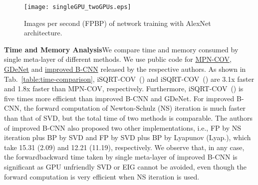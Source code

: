 \documentclass[10pt,twocolumn,letterpaper]{article}
\begin{document}
\begin{figure}[thb]
\vspace{2pt}
\setlength\tabcolsep{8pt}
\renewcommand{\baselinestretch}{1.0}
\footnotesize
\centering
\begin{minipage}[b]{0.65\linewidth}
\centering
\texttt{[image: singleGPU\_twoGPUs.eps]}
\end{minipage}
\caption{Images per second (FPBP) of network training with AlexNet architecture.}
\label{fig:Comparison_time}
\end{figure}




\vspace{4pt}\noindent\textbf{Time and Memory Analysis}\quad We  compare  time and memory consumed by  single meta-layer of different methods. We use  public code for \href{https://github.com/jiangtaoxie/MPN-COV-ConvNet}{MPN-COV},  \href{http://www.peihuali.org/publications/G2DeNet/G2DeNet-FGVC-v1.0.zip}{GDeNet} and \href{https://bitbucket.org/tsungyu/bcnn}{improved B-CNN} released by the respective authors. As shown in Tab.~\ref{table:time-comparison}, iSQRT-COV~() and iSQRT-COV~() are 3.1x faster and 1.8x faster than MPN-COV, respectively. Furthermore, iSQRT-COV~() is  five  times more efficient than  improved B-CNN and GDeNet. For improved B-CNN, the forward computation of Newton-Schulz (NS) iteration is much faster than that of SVD, but the total time of two methods is comparable. The authors of improved B-CNN  also proposed two other implementations, i.e.,  FP by NS iteration plus BP by SVD and FP by SVD plus BP by Lyapunov (Lyap.), which take 15.31 (2.09) and 12.21 (11.19), respectively. We observe that, in any case, the forwardbackward time taken by  single meta-layer of improved B-CNN is significant  as GPU unfriendly SVD or EIG cannot be avoided, even though the forward computation is very  efficient when NS iteration is used. 
\end{document}
